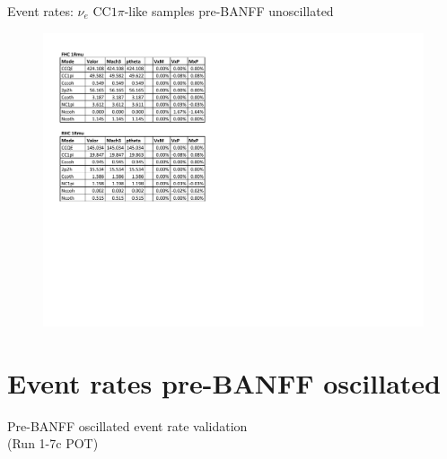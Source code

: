 \documentclass{beamer}
\begin{document}
\begin{frame}{Event rates: $\nu_e\text{ CC}1\pi$-like samples pre-BANFF unoscillated}
	\centering
	\begin{figure}
		\includegraphics[page=3, trim={0cm 15cm 13cm 1cm}, clip, scale=0.52] {images/rates/prefit_unosc}
	\end{figure}
\end{frame}

\section{Event rates pre-BANFF oscillated}
\begin{frame}
	\centering
	\Large Pre-BANFF oscillated event rate validation\\(Run 1-7c POT)
\end{frame}
\end{document}

